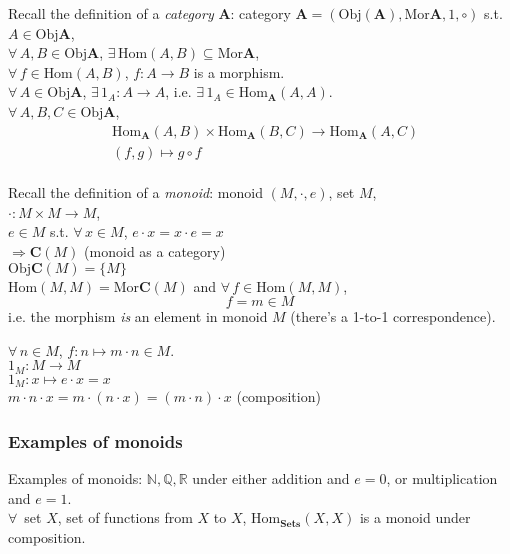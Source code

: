 \documentclass[10pt]{amsart}
\begin{document}
\begin{multicols*}{2}
\begin{itemize}
Recall the definition of a \emph{category} $\mathbf{A}$: category $\mathbf{A} = (\text{Obj}(\mathbf{A}), \text{Mor}{\mathbf{A}}, 1, \circ)$ s.t.\\
$A \in \text{Obj}\mathbf{A}$, \\
$\forall \, A, B \in \text{Obj}\mathbf{A}$, $\exists \, \text{Hom}(A,B) \subseteq \text{Mor}\mathbf{A}$, \\
$\forall \, f \in \text{Hom}(A,B)$, $f:A \to B$ is a morphism.\\
$\forall \, A \in \text{Obj}\mathbf{A}$, $\exists \, 1_A : A \to A$, i.e. $\exists \, 1_A \in \text{Hom}_{\mathbf{A}}(A,A)$. \\
$\forall \, A, B, C \in \text{Obj}\mathbf{A}$,  \\
\[
\begin{aligned} 
	& \text{Hom}_{\mathbf{A}}(A, B) \times \text{Hom}_{\mathbf{A}}(B,C) \to \text{Hom}_{\mathbf{A}}(A, C) \\ 
	& (f,g) \mapsto g\circ f \end{aligned} \] \\

Recall the definition of a \emph{monoid}:
monoid $(M, \cdot, e)$, set $M$, \\
$\cdot : M\times M \to M$, \\
$e \in M$ s.t. $\forall \, x \in M$, $e\cdot x = x \cdot e = x$ \\

$\Longrightarrow \mathbf{C}(M)$ (monoid as a category) \\
$\text{Obj}\mathbf{C}(M) = \lbrace M \rbrace$ \\
$\text{Hom}(M, M) = \text{Mor}\mathbf{C}(M)$ and $\forall \, f \in \text{Hom}(M, M)$, 
\[
f = m \in M
\]
i.e. the morphism \emph{is} an element in monoid $M$ (there's a 1-to-1 correspondence).

$\forall \, n \in M$, $f:n \mapsto m\cdot n \in M$. \\
$1_M : M \to M$ \\
$1_M : x \mapsto e\cdot x = x$ \\
$m\cdot n \cdot x = m\cdot (n\cdot x) = (m\cdot n) \cdot x$ (composition)


	
\subsubsection{Examples of monoids}
	Examples of monoids: $\mathbb{N}, \mathbb{Q}, \mathbb{R}$ under either addition and $e=0$, or multiplication and $e=1$. \\
	$\forall \, $ set $X$, set of functions from $X$ to $X$, $\text{Hom}_{\mathbf{Sets}}(X, X)$ is a monoid under composition. 
	

\end{itemize}
\end{multicols*}
\end{document}
